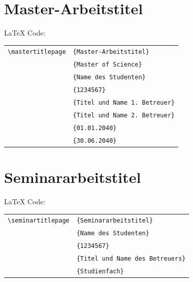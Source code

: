 \documentclass[english, trackchanges, hyperref, ngerman ,pdf, mp, mppdf]{wise}
\newcommand\code[1]{\texttt{#1}}
\newcommand\command[1]{\code{\textbackslash{}#1}}
\begin{document}
\begin{appendix}
\begin{appendices}
\clearpage


\section{Master-Arbeitstitel}\label{sec:titelblatt_masterarbeiten}

\LaTeX{} Code:

\vspace{0.375cm}
\begin{center}\begin{tabular}{ll}
\command{mastertitlepage}&
\code{\{Master-Arbeitstitel\}}\\
&
\code{\{Master of Science\}}\\
&
\code{\{Name des Studenten\}}\\
&
\code{\{1234567\}}\\
&
\code{\{Titel und Name 1. Betreuer\}}\\
&
\code{\{Titel und Name 2. Betreuer\}}\\
&
\code{\{01.01.2040\}}\\
&
\code{\{30.06.2040\}}\\
\end{tabular}\end{center}
\vspace{0.375cm}

\clearpage



\section{Seminararbeitstitel}\label{sec:titelblatt_seminararbeiten}

\LaTeX{} Code:

\vspace{0.375cm}
\begin{center}\begin{tabular}{ll}
\command{seminartitlepage}&
\code{\{Seminararbeitstitel\}}\\
&
\code{\{Name des Studenten\}}\\
&
\code{\{1234567\}}\\
&
\code{\{Titel und Name des Betreuers\}}\\
&
\code{\{Studienfach\}}\\
\end{tabular}\end{center}
\vspace{0.375cm}


\end{appendices}
\end{appendix}
\end{document}
